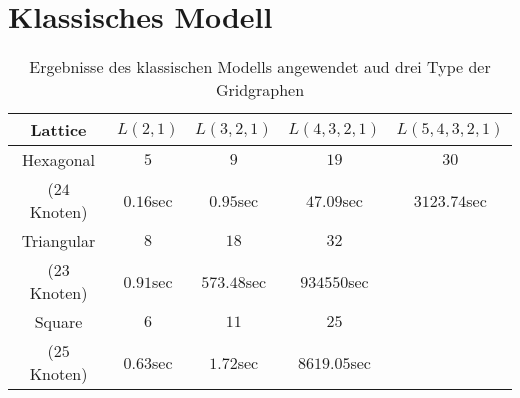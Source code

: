 \documentclass[
	fontsize=12pt,
	paper=a4,
	twoside=false,
	numbers=noenddot,
	plainheadsepline,
	toc=listof,
	toc=bibliography
]{scrartcl}
\begin{document}
\section{Klassisches Modell}
\begin{table}[htbp]
\centering
\begin{tabular}{|c|c|c|c|c|}
\hline 
	Lattice    & $L(2,1)$   & $L(3,2,1)$ & $L(4,3,2,1)$ & $L(5,4,3,2,1)$ \\ \hline 
	Hexagonal  & $5$        & $9$        & $19$         & $30$           \\ 
($24$ Knoten)  & $0.16$sec  & $0.95$sec  & $47.09$sec   & $3123.74$sec   \\ \hline
			   
	Triangular& $8$	        & $18$        &  $32$            &    \\ 
($23$ Knoten) & $0.91$sec   & $573.48$sec &  $934550$sec     &    \\ \hline
			  
	Square    &  $6$	    &  $11$       & $25$         &    \\ 
($25$ Knoten) & $0.63$sec   &  $1.72$sec  & $8619.05$sec & \\ \hline
\end{tabular}
\caption{ Ergebnisse des klassischen Modells angewendet aud drei Type der Gridgraphen} 
\label{Table:T0}
\end{table}
\end{document}
